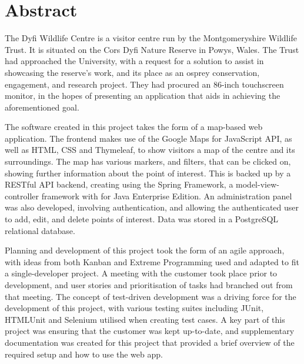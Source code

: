 \thispagestyle{empty}


\section*{\centering Abstract}

The Dyfi Wildlife Centre is a visitor centre run by the Montgomeryshire Wildlife Trust. It is situated on the Cors Dyfi Nature Reserve in Powys, Wales. The Trust had approached the University, with a request for a solution to assist in showcasing the reserve's work, and its place as an osprey conservation, engagement, and research project. They had procured an 86-inch touchscreen monitor, in the hopes of presenting an application that aids in achieving the aforementioned goal.

The software created in this project takes the form of a map-based web application. The frontend makes use of the Google Maps for JavaScript API, as well as HTML, CSS and Thymeleaf, to show visitors a map of the centre and its surroundings. The map has various markers, and filters, that can be clicked on, showing further information about the point of interest. This is backed up by a RESTful API backend, creating using the Spring Framework, a model-view-controller framework with for Java Enterprise Edition. An administration panel was also developed, involving authentication, and allowing the authenticated user to add, edit, and delete points of interest. Data was stored in a PostgreSQL relational database.

Planning and development of this project took the form of an agile approach, with ideas from both Kanban and Extreme Programming used and adapted to fit a single-developer project. A meeting with the customer took place prior to development, and user stories and prioritisation of tasks had branched out from that meeting. The concept of test-driven development was a driving force for the development of this project, with various testing suites including JUnit, HTMLUnit and Selenium utilised when creating test cases. A key part of this project was ensuring that the customer was kept up-to-date, and supplementary documentation was created for this project that provided a brief overview of the required setup and how to use the web app.



